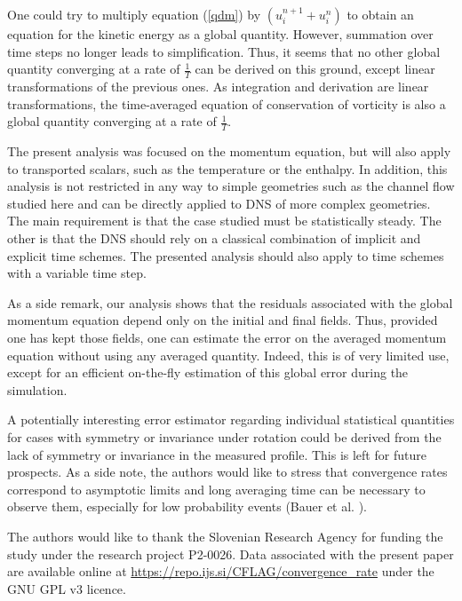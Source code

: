 \documentclass[aip,pof,reprint]{revtex4-1}
\begin{document}
One could try to multiply equation (\ref{qdm}) by $\left( u_i^{n+1}+u_i^n \right)$ to obtain an equation for the kinetic energy as a global quantity.
However, summation over time steps no longer leads to simplification.
Thus, it seems that no other global quantity converging at a rate of $\frac{1}{T}$ can be derived on this ground, except linear transformations of the previous ones.
As integration and derivation are linear transformations, the time-averaged equation of conservation of vorticity is also a global quantity converging at a rate of $\frac{1}{T}$.

The present analysis was focused on the momentum equation, but will also apply to transported scalars, such as the temperature or the enthalpy.
In addition, this analysis is not restricted in any way to simple geometries such as the channel flow studied here and can be directly applied to DNS of more complex geometries.
The main requirement is that the case studied must be statistically steady.
The other is that the DNS should rely on a classical combination of implicit and explicit time schemes.
The presented analysis should also apply to time schemes with a variable time step.

As a side remark, our analysis shows that the residuals associated with the global momentum equation depend only on the initial and final fields.
Thus, provided one has kept those fields, one can estimate the error on the averaged momentum equation without using any averaged quantity.
Indeed, this is of very limited use, except for an efficient on-the-fly estimation of this global error during the simulation.

A potentially interesting error estimator regarding individual statistical quantities for cases with symmetry or invariance under rotation could be derived from the lack of symmetry or invariance in the measured profile.
This is left for future prospects.
As a side note, the authors would like to stress that convergence rates correspond to asymptotic limits and long averaging time can be necessary to observe them, especially for low probability events (Bauer et al. \cite{bauer2017convergence}).

The authors would like to thank the Slovenian Research Agency for funding the study under the research project P2-0026.
Data associated with the present paper are available online at \url{https://repo.ijs.si/CFLAG/convergence_rate} under the GNU GPL v3 licence.


\end{document}
